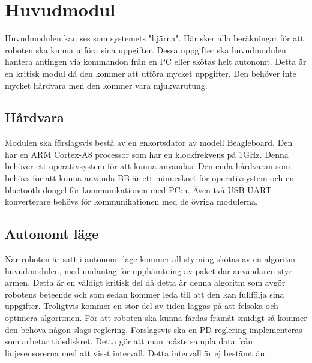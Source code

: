 \section{Huvudmodul}
Huvudmodulen kan ses som systemets "hjärna". Här sker alla beräkningar för att roboten ska kunna utföra sina uppgifter. Dessa uppgifter ska huvudmodulen hantera antingen via kommandon från en PC eller skötas helt autonomt. Detta är en kritisk modul då den kommer att utföra mycket uppgifter. Den behöver inte mycket hårdvara men den kommer vara mjukvarutung.
\subsection{Hårdvara}
Modulen ska förslagsvis bestå av en enkortsdator av modell Beagleboard. Den har en ARM Cortex-A8 processor som har en klockfrekvens på 1GHz. Denna behöver ett operativsystem för att kunna användas. Den enda hårdvaran som behövs för att kunna använda BB är ett minneskort för operativsystem och en bluetooth-dongel för kommunikationen med PC:n. Även två USB-UART konverterare behövs för kommunikationen med de övriga modulerna.
\subsection{Autonomt läge}
När roboten är satt i autonomt läge kommer all styrning skötas av en algoritm i huvudmodulen, med undantag för upphämtning av paket där användaren styr armen. Detta är en väldigt kritisk del då detta är denna algoritm som avgör robotens beteende och som sedan kommer leda till att den kan fullfölja sina uppgifter. Troligtvis kommer en stor del av tiden läggas på att felsöka och optimera algoritmen.
För att roboten ska kunna färdas framåt smidigt så kommer den behöva någon slags reglering. Förslagsvis ska en PD reglering implementeras som arbetar tidsdiskret. Detta gör att man måste sampla data från linjesensorerna med att visst intervall. Detta intervall är ej bestämt än.


